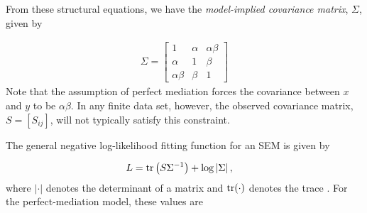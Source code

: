 \documentclass[
]{article}
\begin{document}
From these structural equations, we have the
\textit{model-implied covariance matrix}, \(\Sigma\), given by

\begin{align}
\label{eqn:model_implied_covariance}
\Sigma = 
  \begin{bmatrix}
1 & \alpha & \alpha \beta \\
\alpha & 1 & \beta \\
\alpha \beta & \beta & 1
\end{bmatrix}
\end{align} Note that the assumption of perfect mediation forces the
covariance between \(x\) and \(y\) to be \(\alpha \beta\). In any finite
data set, however, the observed covariance matrix, \(S = [S_{ij}]\),
will not typically satisfy this constraint.

The general negative log-likelihood fitting function for an SEM is given
by

\begin{align}
\label{eq:loglikelihood}
L &= {\rm tr}\left(S \Sigma^{-1}\right) + \log\left|\Sigma\right|,
\end{align} where \(|\cdot|\) denotes the determinant of a matrix and
\({\rm tr}(\cdot)\) denotes the trace \cite{bollen2014structural}. For
the perfect-mediation model, these values are
\end{document}
